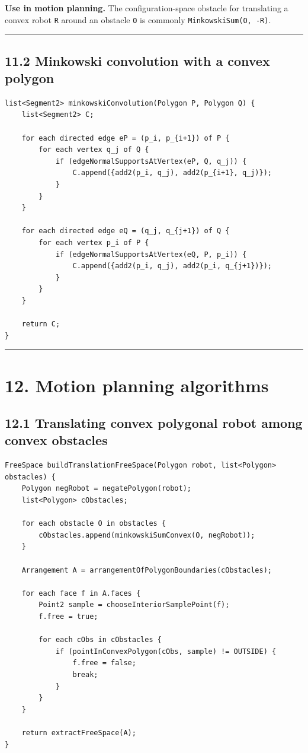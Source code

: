 \documentclass[11pt]{article}
\begin{document}
\textbf{Use in motion planning.} The configuration-space obstacle for
translating a convex robot \texttt{R} around an
obstacle \texttt{O} is commonly
\texttt{MinkowskiSum(O, -R)}.

\begin{center}\rule{0.5\linewidth}{0.5pt}\end{center}

\subsection{11.2 Minkowski convolution with a convex
polygon}\label{minkowski-convolution-with-a-convex-polygon}

\begin{verbatim}
list<Segment2> minkowskiConvolution(Polygon P, Polygon Q) {
    list<Segment2> C;

    for each directed edge eP = (p_i, p_{i+1}) of P {
        for each vertex q_j of Q {
            if (edgeNormalSupportsAtVertex(eP, Q, q_j)) {
                C.append({add2(p_i, q_j), add2(p_{i+1}, q_j)});
            }
        }
    }

    for each directed edge eQ = (q_j, q_{j+1}) of Q {
        for each vertex p_i of P {
            if (edgeNormalSupportsAtVertex(eQ, P, p_i)) {
                C.append({add2(p_i, q_j), add2(p_i, q_{j+1})});
            }
        }
    }

    return C;
}
\end{verbatim}

\begin{center}\rule{0.5\linewidth}{0.5pt}\end{center}

\section{12. Motion planning
algorithms}\label{motion-planning-algorithms}

\subsection{12.1 Translating convex polygonal robot among convex
obstacles}\label{translating-convex-polygonal-robot-among-convex-obstacles}

\begin{verbatim}
FreeSpace buildTranslationFreeSpace(Polygon robot, list<Polygon> obstacles) {
    Polygon negRobot = negatePolygon(robot);
    list<Polygon> cObstacles;

    for each obstacle O in obstacles {
        cObstacles.append(minkowskiSumConvex(O, negRobot));
    }

    Arrangement A = arrangementOfPolygonBoundaries(cObstacles);

    for each face f in A.faces {
        Point2 sample = chooseInteriorSamplePoint(f);
        f.free = true;

        for each cObs in cObstacles {
            if (pointInConvexPolygon(cObs, sample) != OUTSIDE) {
                f.free = false;
                break;
            }
        }
    }

    return extractFreeSpace(A);
}
\end{verbatim}
\end{document}

